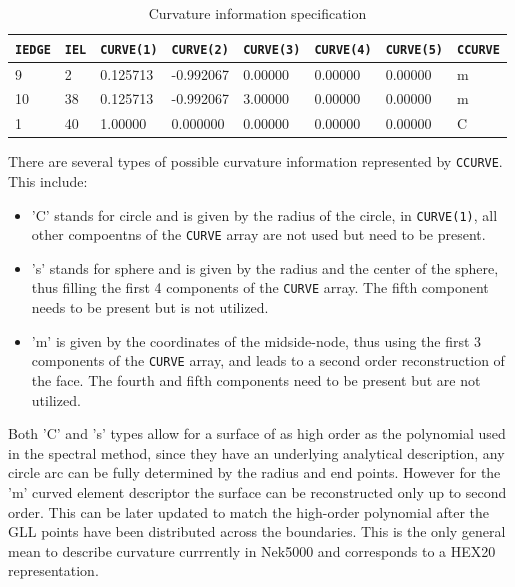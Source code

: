 \begin{description}
\footnotesize
\begin{table} 
     \begin{center}
\begin{tabular}{ l|l|l|l|l|l|l|l }
   \hline
 \texttt{IEDGE}& \texttt{IEL} &\texttt{CURVE(1)} &\texttt{CURVE(2)}&\texttt{CURVE(3)}&\texttt{CURVE(4)}&\texttt{CURVE(5)}&\texttt{CCURVE} \\ \hline \hline
 9   &  2 & 0.125713  &   -0.992067 &      0.00000  &     0.00000 &      0.00000  &   m \\
10   & 38 & 0.125713 &    -0.992067  &     3.00000 &      0.00000  &     0.00000 &    m \\
 1   & 40 & 1.00000  &     0.000000  &     0.00000 &      0.00000  &     0.00000 &    C \\
   \hline
\end{tabular}  
\caption{Curvature information specification } 
\label{tab:midside}
\end{center}
\end{table}
\normalsize

     There are several types of possible curvature information represented by \texttt{CCURVE}. This include:
     \begin{itemize}
     \item 'C' stands for circle and is given by the radius of the circle,  in \texttt{CURVE(1)}, all other compoentns of the \texttt{CURVE} array are not used but need to be present. 
     \item 's' stands for sphere and is given by the radius and the center of the sphere, thus filling the first 4 components of the \texttt{CURVE} array. The fifth component needs to be present but is not utilized. 
     \item 'm' is given by the coordinates of the midside-node, thus using the first 3 components of the \texttt{CURVE} array, and leads to a second order reconstruction of the face.  The fourth and fifth components need to be present but are not utilized.
     \end{itemize}

Both 'C' and 's' types allow for a surface of as high order as the polynomial used in the spectral method, since they have an underlying analytical description, any circle arc can be fully determined by the radius and end points. However for the 'm' curved element descriptor the surface can be reconstructed only up to second order. This can be later updated to match the high-order polynomial after the GLL points have been distributed across the boundaries. This is the only general mean to describe curvature currrently in Nek5000 and corresponds to a HEX20 representation.


\end{description}
